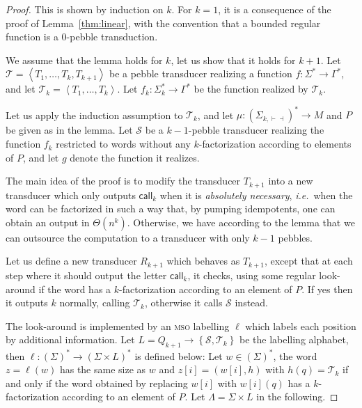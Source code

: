 \documentclass[sigplan,review,anonymous]{acmart}\settopmatter{printfolios=true,printccs=false,printacmref=false}
\newcommand{\set}[1]{\left\{#1 \right\}}
\newcommand{\atuple}[1]{\left\langle #1 \right\rangle}
\newcommand{\Ss}{\mathcal S}
\newcommand{\Tt}{\mathcal T}
\newcommand{\mso}{\textsc{mso}\xspace}
\newcommand{\call}{\mathsf {call}}
\theoremstyle{definition}
\theoremstyle{remark}
\begin{document}
\begin{proof}
    This is shown by induction on $k$.
    For $k=1$, it is a consequence of the proof of Lemma~\ref{thm:linear}, with the convention that a bounded regular function is a $0$-pebble transduction.

    We assume that the lemma holds for $k$, let us show that it holds for $k+1$.
    Let $\Tt=\atuple{T_1,\ldots,T_k,T_{k+1}}$ be a pebble transducer realizing a function $f:\Sigma^*\to\Gamma^*$, and let $\Tt_k=\atuple{T_1,\ldots,T_k}$. Let $f_k:\Sigma_k^*\to \Gamma^*$ be the function realized by $\Tt_k$.

    Let us apply the induction assumption to $\Tt_k$, and let $\mu:(\Sigma_{k,\vdash\dashv})^*\to M$ and $P$ be given as in the lemma. Let $\Ss$ be a $k{-}1$-pebble transducer realizing the function $f_k$ restricted to words without any $k$-factorization according to elements of $P$, and let $g$ denote the function it realizes.

    The main idea of the proof is to modify the transducer $T_{k+1}$ into a new transducer which only outputs $\call_k$ when it is \emph{absolutely necessary}, \textit{i.e.}~when the word can be factorized in such a way that, by pumping idempotents, one can obtain an output in $\Theta(n^k)$.
    Otherwise, we have according to the lemma that we can outsource the computation to a transducer with only $k-1$ pebbles.

    Let us define a new transducer $R_{k+1}$ which behaves as $T_{k+1}$, except that at each step where it should output the letter $\call_k$, it checks, using some regular look-around if the word has a $k$-factorization according to an element of $P$. If yes then it outputs $k$ normally, calling $\Tt_k$, otherwise it calls $\Ss$ instead.

    The look-around is implemented by an \mso labelling $\ell$ which labels each position by additional information.
    Let $L=Q_{k+1}\to \set{\Ss,\Tt_k}$ be the labelling alphabet, then $\ell:(\Sigma)^*\to (\Sigma\times L)^*$ is defined below:
    Let $w\in (\Sigma)^*$, the word $z=\ell(w)$ has the same size as $w$ and $z[i]=(w[i],h)$ with $h(q)=\Tt_k$ if and only if the word obtained by replacing $w[i]$ with $w[i](q)$ has a $k$-factorization according to an element of $P$.
    Let $\Lambda=\Sigma\times L$ in the following.



\end{proof}
\end{document}
